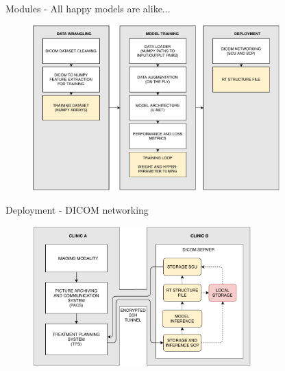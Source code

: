 \documentclass[9pt]{beamer}
\begin{document}
\begin{frame}{Modules - All happy models are alike...}
\begin{figure}
\includegraphics[width=0.85\textwidth]{images/modules}
\end{figure}
\end{frame}


\begin{frame}{Deployment - DICOM networking}
\begin{figure}
\includegraphics[width=0.75\textwidth]{images/dicom_networking}
\end{figure}
\end{frame}
%

\end{document}
